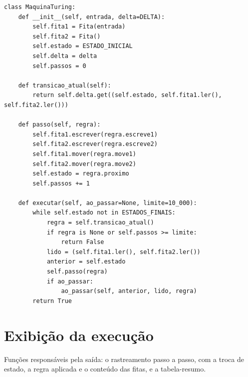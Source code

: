\documentclass[report, 12pt]{uftreport}
\begin{document}
\begin{lstlisting}[style=python, caption={Classe \texttt{MaquinaTuring}}, label={lst:mt}]
class MaquinaTuring:
    def __init__(self, entrada, delta=DELTA):
        self.fita1 = Fita(entrada)
        self.fita2 = Fita()
        self.estado = ESTADO_INICIAL
        self.delta = delta
        self.passos = 0

    def transicao_atual(self):
        return self.delta.get((self.estado, self.fita1.ler(), self.fita2.ler()))

    def passo(self, regra):
        self.fita1.escrever(regra.escreve1)
        self.fita2.escrever(regra.escreve2)
        self.fita1.mover(regra.move1)
        self.fita2.mover(regra.move2)
        self.estado = regra.proximo
        self.passos += 1

    def executar(self, ao_passar=None, limite=10_000):
        while self.estado not in ESTADOS_FINAIS:
            regra = self.transicao_atual()
            if regra is None or self.passos >= limite:
                return False
            lido = (self.fita1.ler(), self.fita2.ler())
            anterior = self.estado
            self.passo(regra)
            if ao_passar:
                ao_passar(self, anterior, lido, regra)
        return True
\end{lstlisting}

\section{Exibição da execução}

Funções responsáveis pela saída: o rastreamento passo a passo, com a troca de estado, a regra aplicada e o conteúdo das fitas, e a tabela-resumo.
\end{document}

